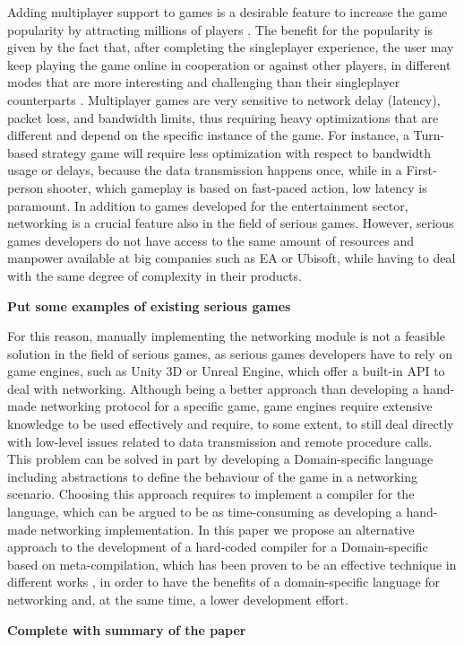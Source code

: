 Adding multiplayer support to games is a desirable feature to increase the game popularity by attracting millions of players \cite{ducheneaut2006alone}. The benefit for the popularity is given by the fact that, after completing the singleplayer experience, the user may keep playing the game online in cooperation or against other players, in different modes that are more interesting and challenging than their singleplayer counterparts \cite{pantel2002impact}. Multiplayer games are very sensitive to network delay (latency), packet loss, and bandwidth limits, thus requiring heavy optimizations that are different and depend on the specific instance of the game. For instance, a Turn-based strategy game will require less optimization with respect to bandwidth usage or delays, because the data transmission happens once, while in a First-person shooter, which gameplay is based on fast-paced action, low latency is paramount. In addition to games developed for the entertainment sector, networking is a crucial feature also in the field of serious games. However, serious games developers do not have access to the same amount of resources and manpower available at big companies such as EA or Ubisoft, while having to deal with the same degree of complexity in their products.

\textbf{Put some examples of existing serious games}

 For this reason, manually implementing the networking module is not a feasible solution in the field of serious games, as serious games developers have to rely on game engines, such as Unity 3D or Unreal Engine, which offer a built-in API to deal with networking. Although being a better approach than developing a hand-made networking protocol for a specific game, game engines require extensive knowledge to be used effectively and require, to some extent, to still deal directly with low-level issues related to data transmission and remote procedure calls. This problem can be solved in part by developing a Domain-specific language including abstractions to define the behaviour of the game in a networking scenario. Choosing this approach requires to implement a compiler for the language, which can be argued to be as time-consuming as developing a hand-made networking implementation. In this paper we propose an alternative approach to the development of a hard-coded compiler for a Domain-specific based on meta-compilation, which has been proven to be an effective technique in different works \cite{kaagedal1998generating, DiGiacomo2017}, in order to have the benefits of a domain-specific language for networking and, at the same time, a lower development effort.
 
 \textbf{Complete with summary of the paper}